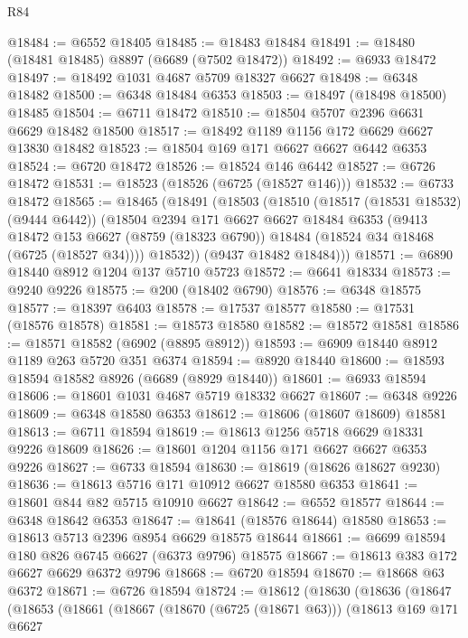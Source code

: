 \begin{lexlean}{R84}
\begin{coremodule}
@18484 := @6552 @18405
@18485 := @18483 @18484
@18491 := @18480 (@18481 @18485) @8897 (@6689 (@7502 @18472))
@18492 := @6933 @18472
@18497 := @18492 @1031 @4687 @5709 @18327 @6627
@18498 := @6348 @18482
@18500 := @6348 @18484 @6353
@18503 := @18497 (@18498 @18500) @18485
@18504 := @6711 @18472
@18510 := @18504 @5707 @2396 @6631 @6629 @18482 @18500
@18517 := @18492 @1189 @1156 @172 @6629 @6627 @13830 @18482
@18523 := @18504 @169 @171 @6627 @6627 @6442 @6353
@18524 := @6720 @18472
@18526 := @18524 @146 @6442
@18527 := @6726 @18472
@18531 := @18523 (@18526 (@6725 (@18527 @146)))
@18532 := @6733 @18472
@18565 := @18465
    (@18491
      (@18503
        (@18510
          (@18517 (@18531 @18532) (@9444 @6442))
          (@18504
            @2394
            @171
            @6627
            @6627
            @18484
            @6353
            (@9413
              @18472
              @153
              @6627
              (@8759 (@18323 @6790))
              @18484
              (@18524 @34 @18468 (@6725 (@18527 @34))))
            @18532))
        (@9437 @18482 @18484)))
@18571 := @6890 @18440 @8912 @1204 @137 @5710 @5723
@18572 := @6641 @18334
@18573 := @9240 @9226
@18575 := @200 (@18402 @6790)
@18576 := @6348 @18575
@18577 := @18397 @6403
@18578 := @17537 @18577
@18580 := @17531 (@18576 @18578)
@18581 := @18573 @18580
@18582 := @18572 @18581
@18586 := @18571 @18582 (@6902 (@8895 @8912))
@18593 := @6909 @18440 @8912 @1189 @263 @5720 @351 @6374
@18594 := @8920 @18440
@18600 := @18593 @18594 @18582 @8926 (@6689 (@8929 @18440))
@18601 := @6933 @18594
@18606 := @18601 @1031 @4687 @5719 @18332 @6627
@18607 := @6348 @9226
@18609 := @6348 @18580 @6353
@18612 := @18606 (@18607 @18609) @18581
@18613 := @6711 @18594
@18619 := @18613 @1256 @5718 @6629 @18331 @9226 @18609
@18626 := @18601 @1204 @1156 @171 @6627 @6627 @6353 @9226
@18627 := @6733 @18594
@18630 := @18619 (@18626 @18627 @9230)
@18636 := @18613 @5716 @171 @10912 @6627 @18580 @6353
@18641 := @18601 @844 @82 @5715 @10910 @6627
@18642 := @6552 @18577
@18644 := @6348 @18642 @6353
@18647 := @18641 (@18576 @18644) @18580
@18653 := @18613 @5713 @2396 @8954 @6629 @18575 @18644
@18661 := @6699 @18594 @180 @826 @6745 @6627 (@6373 @9796) @18575
@18667 := @18613 @383 @172 @6627 @6629 @6372 @9796
@18668 := @6720 @18594
@18670 := @18668 @63 @6372
@18671 := @6726 @18594
@18724 := @18612
    (@18630
      (@18636
        (@18647
          (@18653
            (@18661
              (@18667
                (@18670 (@6725 (@18671 @63)))
                (@18613
                  @169
                  @171
                  @6627

\end{coremodule}
\end{lexlean}
